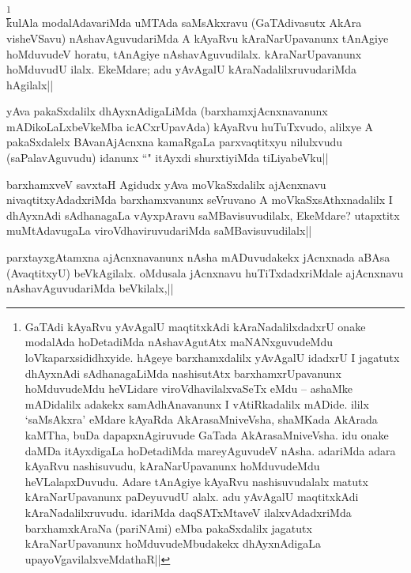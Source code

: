 \begin{artha} 
\footnote[1]{GaTAdi kAyaRvu yAvAgalU maqtitxkAdi kAraNadalilxdadxrU 
onake modalAda hoDetadiMda nAshavAgutAtx maNANxguvudeMdu 
loVkaparxsididhxyide. hAgeye barxhamxdalilx yAvAgalU idadxrU I 
jagatutx dhAyxnAdi sAdhanagaLiMda nashisutAtx barxhamxrUpavanunx 
hoMduvudeMdu heVLidare viroVdhavilalxvaSeTx eMdu -- ashaMke mADidalilx 
adakekx samAdhAnavanunx I vAtiRkadalilx mADide. ililx `saMsAkxra' 
eMdare kAyaRda AkArasaMniveVsha, shaMKada AkArada kaMTha, buDa 
dapapxnAgiruvude GaTada AkArasaMniveVsha. idu onake daMDa itAyxdigaLa 
hoDetadiMda mareyAguvudeV nAsha. adariMda adara kAyaRvu nashisuvudu, 
kAraNarUpavanunx hoMduvudeMdu heVLalapxDuvudu. Adare tAnAgiye kAyaRvu 
nashisuvudalalx matutx kAraNarUpavanunx paDeyuvudU alalx. adu yAvAgalU 
maqtitxkAdi kAraNadalilxruvudu. idariMda daqSATxMtaveV 
ilalxvAdadxriMda barxhamxkAraNa (pariNAmi) eMba pakaSxdalilx jagatutx 
kAraNarUpavanunx hoMduvudeMbudakekx dhAyxnAdigaLa 
upayoVgavilalxveMdathaR||}\\
kulAla modalAdavariMda uMTAda saMsAkxravu (GaTAdivasutx AkAra 
visheVSavu) nAshavAguvudariMda A kAyaRvu kAraNarUpavanunx tAnAgiye 
hoMduvudeV horatu, tAnAgiye nAshavAguvudilalx. kAraNarUpavanunx 
hoMduvudU ilalx. EkeMdare; adu yAvAgalU kAraNadalilxruvudariMda 
hAgilalx||
\end{artha}


\begin{artha} 
yAva pakaSxdalilx dhAyxnAdigaLiMda (barxhamxjAcnxnavanunx 
mADikoLaLxbeVkeMba icACxrUpavAda) kAyaRvu huTuTxvudo, alilxye A 
pakaSxdalelx BAvanAjAcnxna kamaRgaLa parxvaqtitxyu nilulxvudu 
(saPalavAguvudu) idanunx ``\stext" itAyxdi shurxtiyiMda tiLiyabeVku||
\end{artha}


\begin{artha} 
barxhamxveV savxtaH Agidudx yAva moVkaSxdalilx ajAcnxnavu 
nivaqtitxyAdadxriMda barxhamxvanunx seVruvano A moVkaSxsAthxnadalilx I 
dhAyxnAdi sAdhanagaLa vAyxpAravu saMBavisuvudilalx, EkeMdare? 
utapxtitx muMtAdavugaLa viroVdhaviruvudariMda saMBavisuvudilalx||
\end{artha}


\begin{artha} 
parxtayxgAtamxna ajAcnxnavanunx nAsha mADuvudakekx jAcnxnada aBAsa 
(AvaqtitxyU) beVkAgilalx. oMdusala jAcnxnavu huTiTxdadxriMdale 
ajAcnxnavu nAshavAguvudariMda beVkilalx,||
\end{artha}

